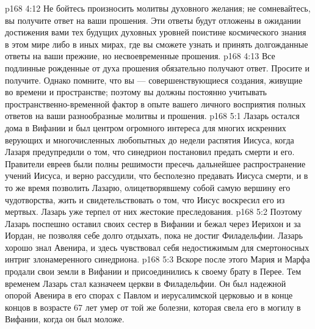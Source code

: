 \vs p168 4:12 \bibnobreakspace Не бойтесь произносить молитвы духовного желания; не сомневайтесь, вы получите ответ на ваши прошения. Эти ответы будут отложены в ожидании достижения вами тех будущих духовных уровней поистине космического знания в этом мире либо в иных мирах, где вы сможете узнать и принять долгожданные ответы на ваши прежние, но несвоевременные прошения.
\vs p168 4:13 \bibnobreakspace Все подлинные рожденные от духа прошения обязательно получают ответ. Просите и получите. Однако помните, что вы --- совершенствующиеся создания, живущие во времени и пространстве; поэтому вы должны постоянно учитывать пространственно\hyp{}временной фактор в опыте вашего личного восприятия полных ответов на ваши разнообразные молитвы и прошения.
\vs p168 5:1 Лазарь остался дома в Вифании и был центром огромного интереса для многих искренних верующих и многочисленных любопытных до недели распятия Иисуса, когда Лазаря предупредили о том, что синедрион постановил предать смерти и его. Правители евреев были полны решимости пресечь дальнейшее распространение учений Иисуса, и верно рассудили, что бесполезно предавать Иисуса смерти, и в то же время позволить Лазарю, олицетворявшему собой самую вершину его чудотворства, жить и свидетельствовать о том, что Иисус воскресил его из мертвых. Лазарь уже терпел от них жестокие преследования.
\vs p168 5:2 Поэтому Лазарь поспешно оставил своих сестер в Вифании и бежал через Иерихон и за Иордан, не позволяя себе долго отдыхать, пока не достиг Филадельфии. Лазарь хорошо знал Авенира, и здесь чувствовал себя недостижимым для смертоносных интриг злонамеренного синедриона.
\vs p168 5:3 Вскоре после этого Мария и Марфа продали свои земли в Вифании и присоединились к своему брату в Перее. Тем временем Лазарь стал казначеем церкви в Филадельфии. Он был надежной опорой Авенира в его спорах с Павлом и иерусалимской церковью и в конце концов в возрасте 67 лет умер от той же болезни, которая свела его в могилу в Вифании, когда он был моложе.

